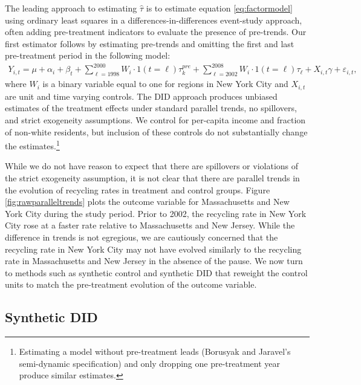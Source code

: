 \documentclass[12pt]{article}
\begin{document}
The leading approach to estimating \(\hat{\tau}\) is to estimate equation \ref{eq:factormodel} using ordinary least squares in a differences-in-differences event-study approach, often adding pre-treatment indicators to evaluate the presence of pre-trends.  Our first estimator follows \cite{borusyakjaravel2018} by estimating pre-trends and omitting the first and last pre-treatment period in the following model:
\begin{align} \label{eq:did}
    Y_{i,t} = \mu + \alpha_i + \beta_t + \sum_{\ell = 1998}^{2000} W_{i} \cdot 1(t=\ell) \tau_k^{pre} +  \sum_{\ell=2002}^{2008} W_{i} \cdot 1(t=\ell) \tau_\ell + X_{i,t}\gamma + \varepsilon_{i,t},
\end{align}
where \(W_i\) is a binary variable equal to one for regions in New York City and \(X_{i,t}\) are unit and time varying controls. The DID approach produces unbiased estimates of the treatment effects under standard parallel trends, no spillovers, and strict exogeneity assumptions. We control for per-capita income and fraction of non-white residents, but inclusion of these controls do not substantially change the estimates.\footnote{Estimating a model without pre-treatment leads (Borusyak and Jaravel's semi-dynamic specification) and only dropping one pre-treatment year produce similar estimates.}  

While we do not have reason to expect that there are spillovers or violations of the strict exogeneity assumption, it is not clear that there are parallel trends in the evolution of recycling rates in treatment and control groups.  Figure \ref{fig:rawparalleltrends} plots the outcome variable for Massachusetts and New York City during the study period.  Prior to 2002, the recycling rate in New York City rose at a faster rate relative to Massachusetts and New Jersey.  While the difference in trends is not egregious, we are cautiously concerned that the recycling rate in New York City may not have evolved similarly to the recycling rate in Massachusetts and New Jersey in the absence of the pause.  We now turn to methods such as synthetic control and synthetic DID that reweight the control units to match the pre-treatment evolution of the outcome variable.

\subsection{Synthetic DID}
\end{document}
